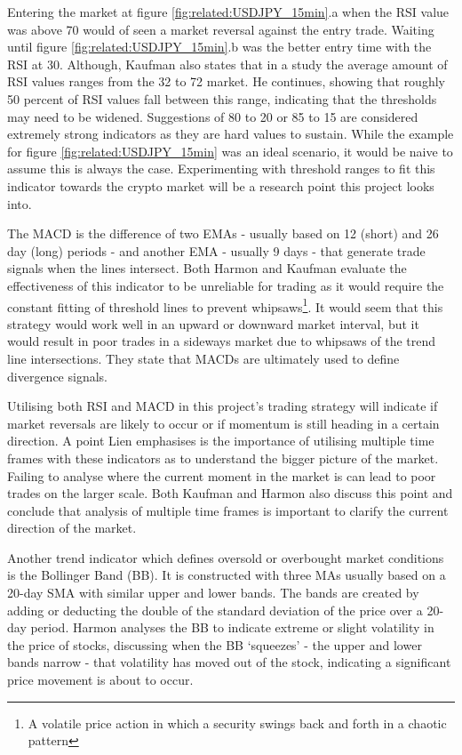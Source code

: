 Entering the market at figure \ref{fig:related:USDJPY_15min}.a when the RSI value was above 70 would of seen a market reversal against the entry trade. Waiting until figure \ref{fig:related:USDJPY_15min}.b was the better entry time with the RSI at 30. Although, Kaufman \cite{BOOK:Kaufman:2013} also states that in a study the average amount of RSI values ranges from the 32 to 72 market. He continues, showing that roughly 50 percent of RSI values fall between this range, indicating that the thresholds may need to be widened. Suggestions of 80 to 20 or 85 to 15 are considered extremely strong indicators as they are hard values to sustain. While the example for figure \ref{fig:related:USDJPY_15min} was an ideal scenario, it would be naive to assume this is always the case. Experimenting with threshold ranges to fit this indicator towards the crypto market will be a research point this project looks into.

The MACD is the difference of two EMAs - usually based on 12 (short) and 26 day (long) periods - and another EMA - usually 9 days - that generate trade signals when the lines intersect. Both Harmon \cite{BOOK:Harmon:2014} and Kaufman \cite{BOOK:Kaufman:2013} evaluate the effectiveness of this indicator to be unreliable for trading as it would require the constant fitting of threshold lines to prevent whipsaws\footnote{A volatile price action in which a security swings back and forth in a chaotic pattern}. It would seem that this strategy would work well in an upward or downward market interval, but it would result in poor trades in a sideways market due to whipsaws of the trend line intersections. They state that MACDs are ultimately used to define divergence signals.

Utilising both RSI and MACD in this project's trading strategy will indicate if market reversals are likely to occur or if momentum is still heading in a certain direction. A point Lien \cite{BOOK:Lien:2016} emphasises is the importance of utilising multiple time frames with these indicators as to understand the bigger picture of the market. Failing to analyse where the current moment in the market is can lead to poor trades on the larger scale. Both Kaufman \cite{BOOK:Kaufman:2013} and Harmon \cite{BOOK:Harmon:2014} also discuss this point and conclude that analysis of multiple time frames is important to clarify the current direction of the market.

Another trend indicator which defines oversold or overbought market conditions is the Bollinger Band (BB). It is constructed with three MAs usually based on a 20-day SMA with similar upper and lower bands. The bands are created by adding or deducting the double of the standard deviation of the price over a 20-day period.  Harmon \cite{BOOK:Harmon:2014} analyses the BB to indicate extreme or slight volatility in the price of stocks, discussing when the BB `squeezes' - the upper and lower bands narrow - that volatility has moved out of the stock, indicating a significant price movement is about to occur. 

